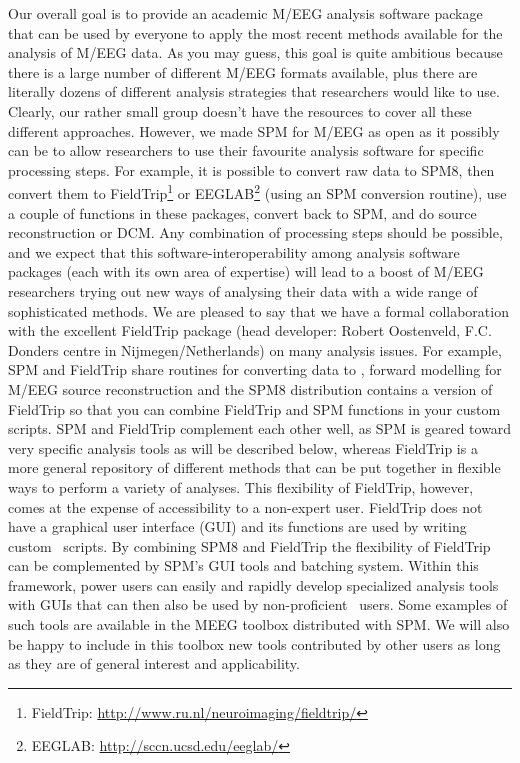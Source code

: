 Our overall goal is to provide an academic M/EEG analysis software package that can be used by everyone to apply the most recent methods available for the analysis of M/EEG data. As you may guess, this goal is quite ambitious because there is a large number of different M/EEG formats available, plus there are literally dozens of different analysis strategies that researchers would like to use. Clearly, our rather small group doesn't have the resources to cover all these different approaches. However, we made SPM for M/EEG as open as it possibly can be to allow researchers to use their favourite analysis software for specific processing steps. For example, it is possible to convert raw data to SPM8, then convert them to FieldTrip\footnote{FieldTrip: \url{http://www.ru.nl/neuroimaging/fieldtrip/}} or EEGLAB\footnote{EEGLAB: \url{http://sccn.ucsd.edu/eeglab/}} (using an SPM conversion routine), use a couple of functions in these packages, convert back to SPM, and do source reconstruction or DCM. Any combination of processing steps should be possible, and we expect that this software-interoperability among analysis software packages (each with its own area of expertise) will lead to a boost of M/EEG researchers trying out new ways of analysing their data with a wide range of sophisticated methods. We are pleased to say that we have a formal collaboration with the excellent FieldTrip package (head developer: Robert Oostenveld, F.C. Donders centre in Nijmegen/Netherlands) on many analysis issues. For example, SPM and FieldTrip share routines for converting data to \matlab, forward modelling for M/EEG source reconstruction and the SPM8 distribution contains a version of FieldTrip so that you can combine FieldTrip and SPM functions in your custom scripts. SPM and FieldTrip complement each other well, as SPM is geared toward very specific analysis tools as will be described below, whereas FieldTrip is a more general repository of different methods that can be put together in flexible ways to perform a variety of analyses. This flexibility of FieldTrip, however, comes at the expense of accessibility to a non-expert user. FieldTrip does not have a graphical user interface (GUI) and its functions are used by writing custom \matlab\ scripts. By combining SPM8 and FieldTrip the flexibility of FieldTrip can be complemented by SPM's GUI tools and batching system. Within this framework, power users can easily and rapidly develop specialized analysis tools with GUIs that can then  also be used by non-proficient \matlab\ users. Some examples of such tools are available in the MEEG toolbox distributed with SPM. We will also be happy to include in this toolbox new tools contributed by other users as long as they are of general interest and applicability.
